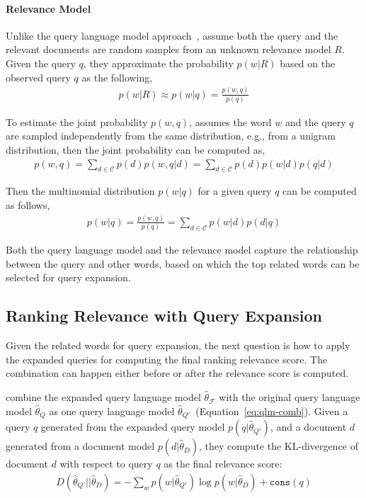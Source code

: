 \paragraph{Relevance Model}

Unlike the query language model approach~\citep{zhai-01b},
\citet{Lavrenko-2001} assume both the query and the relevant documents
are random samples from an unknown relevance model $R$. Given the
query $q$, they approximate the probability $p(w|R)$ based on the
observed query $q$ as the following,
\begin{align}
p(w|R) \approx p(w|q) = \frac{p(w,q)}{p(q)}
\end{align}

To estimate the joint probability $p(w,q)$, \citet{Lavrenko-2001}
assumes the word $w$ and the query $q$ are sampled independently from
the same distribution, e.g., from a unigram distribution, then the
joint probability can be computed as,
\begin{align}
p(w, q) = \sum_{d \in \mathcal{C}} p(d) p(w,q |d) = \sum_{d \in \mathcal{C}} p(d) p(w|d) p(q | d)
\end{align}

Then the multinomial distribution $p(w|q)$ for a given query $q$ can
be computed as follows,
\begin{align}
\label{eq:rm_qe}
p(w|q) = \frac{p(w, q)}{p(q)} = \sum_{d \in \mathcal{C}} p(w|d) p(d|q)
\end{align}

Both the query language model and the relevance model capture the
relationship between the query and other words, based on which the top
related words can be selected for query expansion.

\subsection{Ranking Relevance with Query Expansion}

Given the related words for query expansion, the next question is how
to apply the expanded queries for computing the final ranking
relevance score. The combination can happen either before or after the
relevance score is computed.

\citet{zhai-01b} combine the expanded query language model
$\hat{\theta}_{\mathcal{F}}$ with the original query language model
$\hat{\theta}_{Q}$ as one query language model $\hat{\theta}_{Q'}
$~(Equation~\ref{eq:qlm-comb}). Given a query $q$ generated from the
expanded query model $p(q|\hat{\theta}_{Q'})$, and a document $d$
generated from a document model $p(d|\hat{\theta}_D)$, they compute
the KL-divergence of document $d$ with respect to query $q$ as the
final relevance score:
\begin{align}
\label{eq:KL}
D(\hat{\theta}_{Q'} || \hat{\theta}_D) = -\sum_w p(w|\hat{\theta}_{Q'}) \log p(w | \hat{\theta}_D) + \texttt{cons}(q)
\end{align}

